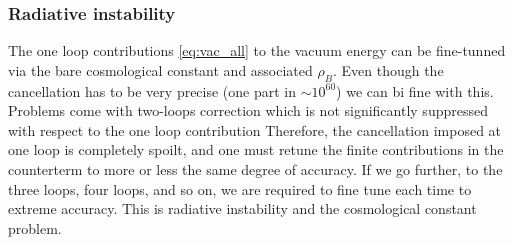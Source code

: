\subsubsection{Radiative instability}
The one loop contributions \eqref{eq:vac_all} to the vacuum energy can be fine-tunned via the bare cosmological constant and associated $\rho_B$. Even though the cancellation has to be very precise (one part in $\sim10^{60}$) we can bi fine with this. Problems come with two-loops correction which is not significantly suppressed with respect to the one loop contribution 
Therefore, the cancellation imposed at one loop is completely spoilt, and one must retune the finite contributions in the counterterm to more or less the same degree of accuracy. If we go further, to the three loops, four loops, and so on, we are required to fine tune each time to extreme accuracy. This is radiative instability and the cosmological constant problem.


